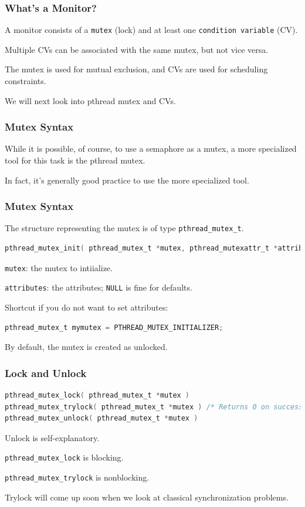 \begin{frame}
	\frametitle{What's a Monitor?}

	A monitor consists of a \texttt{mutex} (lock) and at least one \texttt{condition variable} (CV).

	Multiple CVs can be associated with the same mutex, but not vice versa.

	The mutex is used for mutual exclusion, and CVs are used for scheduling constraints.

	We will next look into pthread mutex and CVs.

\end{frame}

\begin{frame}
	\frametitle{Mutex Syntax}

	While it is possible, of course, to use a semaphore as a mutex, a more specialized tool for this task is the pthread mutex.

	In fact, it's generally good practice to use the more specialized tool.

\end{frame}

\begin{frame}[fragile]
	\frametitle{Mutex Syntax}

	The structure representing the mutex is of type \texttt{pthread\_mutex\_t}.

	\begin{lstlisting}[language=C]
pthread_mutex_init( pthread_mutex_t *mutex, pthread_mutexattr_t *attributes )
\end{lstlisting}

	\texttt{mutex}: the mutex to intiialize.

	\texttt{attributes}: the attributes; \texttt{NULL} is fine for defaults.

	Shortcut if you do not want to set attributes:

	\begin{lstlisting}[language=C]
pthread_mutex_t mymutex = PTHREAD_MUTEX_INITIALIZER;
\end{lstlisting}

	By default, the mutex is created as unlocked.

\end{frame}

\begin{frame}[fragile]
	\frametitle{Lock and Unlock}

	\begin{lstlisting}[language=C]
pthread_mutex_lock( pthread_mutex_t *mutex )
pthread_mutex_trylock( pthread_mutex_t *mutex ) /* Returns 0 on success */
pthread_mutex_unlock( pthread_mutex_t *mutex )
\end{lstlisting}

	Unlock is self-explanatory.

	\texttt{pthread\_mutex\_lock} is blocking.

	\texttt{pthread\_mutex\_trylock} is nonblocking.

	Trylock will come up soon when we look at classical synchronization problems.

\end{frame}

